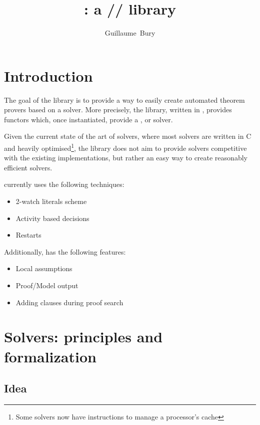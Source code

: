 \documentclass{article}
\begin{document}
\title{\msat{}: a \sat{}/\smt{}/\mcsat{} library}
\author{Guillaume~Bury}

\maketitle

\section{Introduction}

The goal of the \msat{} library is to provide a way to easily
create automated theorem provers based on a \sat{} solver. More precisely,
the library, written in \ocaml{}, provides functors which, once instantiated,
provide a \sat{}, \smt{} or \mcsat{} solver.

Given the current state of the art of \smt{} solvers, where most \sat{} solvers
are written in C and heavily optimised\footnote{Some solvers now have instructions
to manage a processor's cache}, the \msat{} library does not aim to provide solvers
competitive with the existing implementations, but rather an easy way to create
reasonably efficient solvers.

\msat{} currently uses the following techniques:
\begin{itemize}
  \item 2-watch literals scheme
  \item Activity based decisions
  \item Restarts
\end{itemize}

Additionally, \msat{} has the following features:
\begin{itemize}
  \item Local assumptions
  \item Proof/Model output
  \item Adding clauses during proof search
\end{itemize}

\clearpage

\tableofcontents{}

\clearpage

\section{\sat{} Solvers: principles and formalization}\label{sec:sat}

\subsection{Idea}
\end{document}
